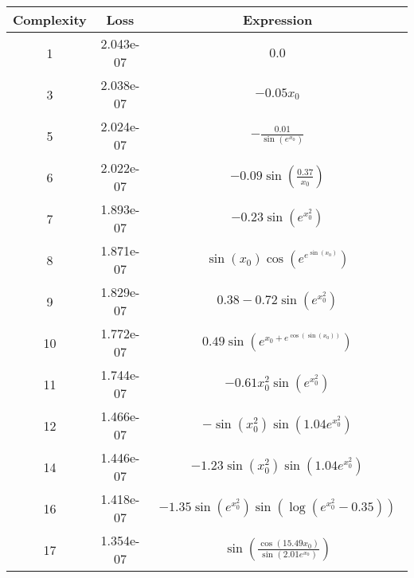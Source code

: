 \begin{center}
        \begin{tabular}{|c|c|c|}
        \hline
        Complexity & Loss & Expression \\
        \hline
        1 & 2.043e-07 & $\begin{aligned}0.0\end{aligned}$\\ \hline3 & 2.038e-07 & $\begin{aligned}- 0.05 x_{0}\end{aligned}$\\ \hline5 & 2.024e-07 & $\begin{aligned}- \frac{0.01}{\sin{\left(e^{x_{0}} \right)}}\end{aligned}$\\ \hline6 & 2.022e-07 & $\begin{aligned}- 0.09 \sin{\left(\frac{0.37}{x_{0}} \right)}\end{aligned}$\\ \hline7 & 1.893e-07 & $\begin{aligned}- 0.23 \sin{\left(e^{x_{0}^{2}} \right)}\end{aligned}$\\ \hline8 & 1.871e-07 & $\begin{aligned}\sin{\left(x_{0} \right)} \cos{\left(e^{e^{\sin{\left(x_{0} \right)}}} \right)}\end{aligned}$\\ \hline9 & 1.829e-07 & $\begin{aligned}0.38 - 0.72 \sin{\left(e^{x_{0}^{2}} \right)}\end{aligned}$\\ \hline10 & 1.772e-07 & $\begin{aligned}0.49 \sin{\left(e^{x_{0} + e^{\cos{\left(\sin{\left(x_{0} \right)} \right)}}} \right)}\end{aligned}$\\ \hline11 & 1.744e-07 & $\begin{aligned}- 0.61 x_{0}^{2} \sin{\left(e^{x_{0}^{2}} \right)}\end{aligned}$\\ \hline12 & 1.466e-07 & $\begin{aligned}- \sin{\left(x_{0}^{2} \right)} \sin{\left(1.04 e^{x_{0}^{2}} \right)}\end{aligned}$\\ \hline14 & 1.446e-07 & $\begin{aligned}- 1.23 \sin{\left(x_{0}^{2} \right)} \sin{\left(1.04 e^{x_{0}^{2}} \right)}\end{aligned}$\\ \hline16 & 1.418e-07 & $\begin{aligned}- 1.35 \sin{\left(e^{x_{0}^{2}} \right)} \sin{\left(\log{\left(e^{x_{0}^{2}} - 0.35 \right)} \right)}\end{aligned}$\\ \hline17 & 1.354e-07 & $\begin{aligned}\sin{\left(\frac{\cos{\left(15.49 x_{0} \right)}}{\sin{\left(2.01 e^{x_{0}} \right)}} \right)}\end{aligned}$\\ 
\end{tabular}
\end{center}
